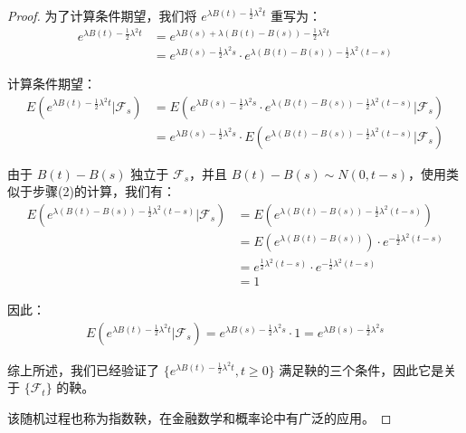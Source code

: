 \documentclass[lang=cn,10pt,thmcnt=section]{elegantbook}
\begin{document}
\begin{proof}
		为了计算条件期望，我们将 $e^{\lambda B(t) - \frac{1}{2} \lambda^2 t}$ 重写为：
		\begin{align}
		e^{\lambda B(t) - \frac{1}{2} \lambda^2 t} &= e^{\lambda B(s) + \lambda(B(t) - B(s)) - \frac{1}{2} \lambda^2 t} \\
		&= e^{\lambda B(s) - \frac{1}{2} \lambda^2 s} \cdot e^{\lambda(B(t) - B(s)) - \frac{1}{2} \lambda^2 (t-s)}
		\end{align}
		
		计算条件期望：
		\begin{align}
		E(e^{\lambda B(t) - \frac{1}{2} \lambda^2 t} | \mathcal{F}_s) &= E(e^{\lambda B(s) - \frac{1}{2} \lambda^2 s} \cdot e^{\lambda(B(t) - B(s)) - \frac{1}{2} \lambda^2 (t-s)} | \mathcal{F}_s) \\
		&= e^{\lambda B(s) - \frac{1}{2} \lambda^2 s} \cdot E(e^{\lambda(B(t) - B(s)) - \frac{1}{2} \lambda^2 (t-s)} | \mathcal{F}_s)
		\end{align}
		
		由于 $B(t) - B(s)$ 独立于 $\mathcal{F}_s$，并且 $B(t) - B(s) \sim N(0, t-s)$，使用类似于步骤(2)的计算，我们有：
		\begin{align}
		E(e^{\lambda(B(t) - B(s)) - \frac{1}{2} \lambda^2 (t-s)} | \mathcal{F}_s) &= E(e^{\lambda(B(t) - B(s)) - \frac{1}{2} \lambda^2 (t-s)}) \\
		&= E(e^{\lambda(B(t) - B(s))}) \cdot e^{-\frac{1}{2} \lambda^2 (t-s)} \\
		&= e^{\frac{1}{2} \lambda^2 (t-s)} \cdot e^{-\frac{1}{2} \lambda^2 (t-s)} \\
		&= 1
		\end{align}
		
		因此：
		\begin{align}
		E(e^{\lambda B(t) - \frac{1}{2} \lambda^2 t} | \mathcal{F}_s) = e^{\lambda B(s) - \frac{1}{2} \lambda^2 s} \cdot 1 = e^{\lambda B(s) - \frac{1}{2} \lambda^2 s}
		\end{align}
		
		综上所述，我们已经验证了 $\{e^{\lambda B(t) - \frac{1}{2} \lambda^2 t}, t \geq 0\}$ 满足鞅的三个条件，因此它是关于 $\{\mathcal{F}_t\}$ 的鞅。
		
		该随机过程也称为指数鞅，在金融数学和概率论中有广泛的应用。
\end{proof}
\end{document}
